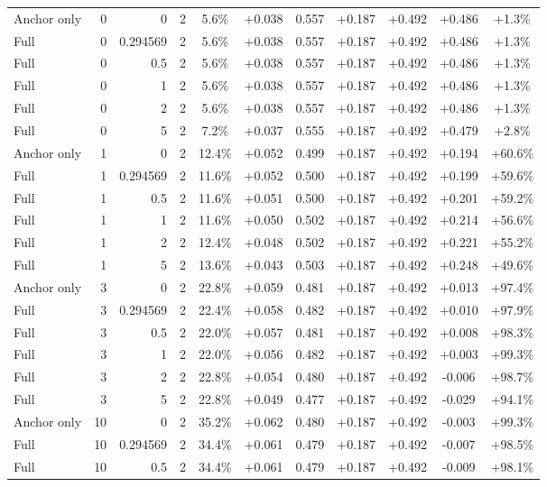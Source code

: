 \begin{table}[htbp]
\begin{tabular}{lrrrccccccc}
Anchor only & 0 & 0 & 2 & 5.6\% & +0.038 & 0.557 & +0.187 & +0.492 & +0.486 & +1.3\% \\
Full & 0 & 0.294569 & 2 & 5.6\% & +0.038 & 0.557 & +0.187 & +0.492 & +0.486 & +1.3\% \\
Full & 0 & 0.5 & 2 & 5.6\% & +0.038 & 0.557 & +0.187 & +0.492 & +0.486 & +1.3\% \\
Full & 0 & 1 & 2 & 5.6\% & +0.038 & 0.557 & +0.187 & +0.492 & +0.486 & +1.3\% \\
Full & 0 & 2 & 2 & 5.6\% & +0.038 & 0.557 & +0.187 & +0.492 & +0.486 & +1.3\% \\
Full & 0 & 5 & 2 & 7.2\% & +0.037 & 0.555 & +0.187 & +0.492 & +0.479 & +2.8\% \\
Anchor only & 1 & 0 & 2 & 12.4\% & +0.052 & 0.499 & +0.187 & +0.492 & +0.194 & +60.6\% \\
Full & 1 & 0.294569 & 2 & 11.6\% & +0.052 & 0.500 & +0.187 & +0.492 & +0.199 & +59.6\% \\
Full & 1 & 0.5 & 2 & 11.6\% & +0.051 & 0.500 & +0.187 & +0.492 & +0.201 & +59.2\% \\
Full & 1 & 1 & 2 & 11.6\% & +0.050 & 0.502 & +0.187 & +0.492 & +0.214 & +56.6\% \\
Full & 1 & 2 & 2 & 12.4\% & +0.048 & 0.502 & +0.187 & +0.492 & +0.221 & +55.2\% \\
Full & 1 & 5 & 2 & 13.6\% & +0.043 & 0.503 & +0.187 & +0.492 & +0.248 & +49.6\% \\
Anchor only & 3 & 0 & 2 & 22.8\% & +0.059 & 0.481 & +0.187 & +0.492 & +0.013 & +97.4\% \\
Full & 3 & 0.294569 & 2 & 22.4\% & +0.058 & 0.482 & +0.187 & +0.492 & +0.010 & +97.9\% \\
Full & 3 & 0.5 & 2 & 22.0\% & +0.057 & 0.481 & +0.187 & +0.492 & +0.008 & +98.3\% \\
Full & 3 & 1 & 2 & 22.0\% & +0.056 & 0.482 & +0.187 & +0.492 & +0.003 & +99.3\% \\
Full & 3 & 2 & 2 & 22.8\% & +0.054 & 0.480 & +0.187 & +0.492 & -0.006 & +98.7\% \\
Full & 3 & 5 & 2 & 22.8\% & +0.049 & 0.477 & +0.187 & +0.492 & -0.029 & +94.1\% \\
Anchor only & 10 & 0 & 2 & 35.2\% & +0.062 & 0.480 & +0.187 & +0.492 & -0.003 & +99.3\% \\
Full & 10 & 0.294569 & 2 & 34.4\% & +0.061 & 0.479 & +0.187 & +0.492 & -0.007 & +98.5\% \\
Full & 10 & 0.5 & 2 & 34.4\% & +0.061 & 0.479 & +0.187 & +0.492 & -0.009 & +98.1\% \\

\end{tabular}
\end{table}
